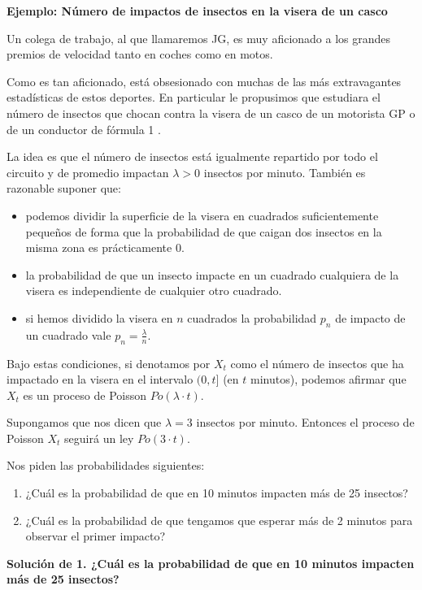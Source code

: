 \documentclass[]{book}
\providecommand{\tightlist}{%
  \setlength{\itemsep}{0pt}\setlength{\parskip}{0pt}}
\begin{document}
\textbf{Ejemplo: Número de impactos de insectos en la visera de un casco}

Un colega de trabajo, al que llamaremos JG, es muy aficionado a los grandes premios de velocidad tanto en coches como en motos.

Como es tan aficionado, está obsesionado con muchas de las más extravagantes estadísticas de estos deportes.
En particular le propusimos que estudiara el número de insectos que chocan contra la visera de un casco de un motorista GP o de un conductor de fórmula 1 .

La idea es que el número de insectos está igualmente repartido por todo el circuito y de promedio impactan \(\lambda>0\) insectos por minuto. También es razonable suponer que:

\begin{itemize}
\tightlist
\item
  podemos dividir la superficie de la visera en cuadrados suficientemente pequeños de forma que la probabilidad de que caigan dos insectos en la misma zona es prácticamente 0.
\item
  la probabilidad de que un insecto impacte en un cuadrado cualquiera de la visera es independiente de cualquier otro cuadrado.
\item
  si hemos dividido la visera en \(n\) cuadrados la probabilidad \(p_n\) de impacto de un cuadrado vale \(p_n=\frac{\lambda}{n}\).
\end{itemize}

Bajo estas condiciones, si denotamos por \(X_t\) como el número de insectos que ha impactado en la visera en el intervalo \((0,t]\) (en \(t\) minutos), podemos afirmar que \(X_t\) es un proceso de Poisson \(Po(\lambda\cdot t)\).

Supongamos que nos dicen que \(\lambda=3\) insectos por minuto. Entonces el proceso de Poisson \(X_t\) seguirá un ley \(Po(3\cdot t).\)

Nos piden las probabilidades siguientes:

\begin{enumerate}
\def\labelenumi{\arabic{enumi}.}
\tightlist
\item
  ¿Cuál es la probabilidad de que en 10 minutos impacten más de 25 insectos?
\item
  ¿Cuál es la probabilidad de que tengamos que esperar más de 2 minutos para observar el primer impacto?
\end{enumerate}

\textbf{Solución de 1. ¿Cuál es la probabilidad de que en 10 minutos impacten más de 25 insectos?}
\end{document}
